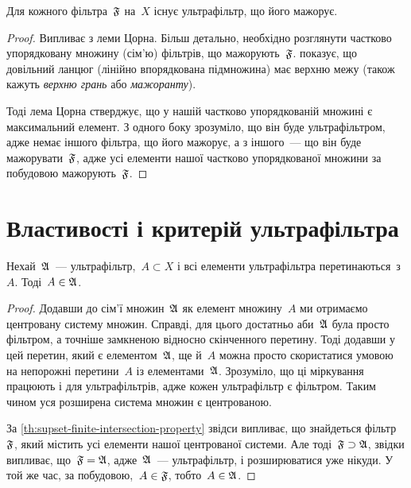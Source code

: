 \begin{theorem}
    \label{th:every-filter-has-supset-ultrafilter}
    Для кожного фільтра~$\frak F$ на~$X$ існує ультрафільтр, що його мажорує.
\end{theorem}
\begin{proof}
    Випливає з леми Цорна. Більш детально, необхідно розглянути частково упорядковану множину (сім'ю) фільтрів, що мажорують~$\frak F$.  показує, що довільний ланцюг (лінійно впорядкована підмножина) має верхню межу (також кажуть \emph{верхню грань} або \emph{мажоранту}). 
    
    Тоді лема Цорна стверджує, що у нашій частково упорядкованій множині є максимальний елемент. З одного боку зрозуміло, що він буде ультрафільтром, адже немає іншого фільтра, що його мажорує, а з іншого~--- що він буде мажорувати~$\frak F$, адже усі елементи нашої частково упорядкованої множини за побудовою мажорують~$\frak F$.
\end{proof}

\section{Властивості і критерій ультрафільтра}

\begin{lemma}
    \label{lem:ultrafilter-absorbs-intersections}
    Нехай~$\frak A$~--- ультрафільтр,~$A \subset X$ і всі елементи ультрафільтра перетинаються~з~$A$. Тоді~$A \in \frak A$.
\end{lemma}
\begin{proof}
    Додавши до сім'ї множин~$\frak A$ як елемент множину~$A$ ми отримаємо центровану систему множин. Справді, для цього достатньо аби~$\frak A$ була просто фільтром, а точніше замкненою відносно скінченного перетину. Тоді додавши у цей перетин, який є елементом~$\frak A$, ще й~$A$ можна просто скористатися умовою на непорожні перетини~$A$ із елементами~$\frak A$. Зрозуміло, що ці міркування працюють і для ультрафільтрів, адже кожен ультрафільтр є фільтром. Таким чином уся розширена система множин є центрованою. 
    
    За \cref{th:supset-finite-intersection-property} звідси випливає, що знайдеться фільтр~$\frak F$, який містить усі елементи нашої центрованої системи. Але тоді~$\frak F \supset \frak A$, звідки випливає, що~$\frak F = \frak A$, адже~$\frak A$~--- ультрафільтр, і розширюватися уже нікуди. У той же час, за побудовою,~$A \in \frak F$, тобто~$A \in \frak A$.
\end{proof}

